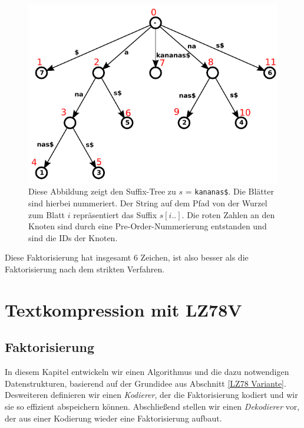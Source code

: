 \documentclass[a4paper,11pt]{scrartcl}%
\theoremstyle{change}
\theoremstyle{nonumberplain}
\theoremstyle{change}
\theoremstyle{nonumberplain}
\theoremstyle{change}
\theoremstyle{nonumberplain}
\begin{document}
\begin{figure}[h]
	    \centering
		\includegraphics[scale=0.75]{./pics/kananas_suffixTree_inorder}
		 \caption{Diese Abbildung zeigt den Suffix-Tree zu $s$ = \texttt{kananas\$}. Die Blätter sind hierbei nummeriert. Der String auf dem Pfad von der Wurzel zum Blatt $i$ repräsentiert das Suffix $s[i..]$. Die roten Zahlen an den Knoten sind durch eine Pre-Order-Nummerierung entstanden und sind die IDs der Knoten.}
		 \label{fig:kananas}
\end{figure}

Diese Faktorisierung hat insgesamt 6 Zeichen, ist also besser als die Faktorisierung nach dem strikten Verfahren.

\section{Textkompression mit LZ78V}

\subsection{Faktorisierung}

In diesem Kapitel entwickeln wir einen Algorithmus und die dazu notwendigen Datenstrukturen, basierend auf der Grundidee aus Abschnitt \ref{LZ78 Variante}. 
Desweiteren definieren wir einen \textit{Kodierer}, der die Faktorisierung kodiert und wir sie so effizient abspeichern können.
Abschließend stellen wir einen \textit{Dekodierer} vor, der aus einer Kodierung wieder eine Faktorisierung aufbaut.
\end{document}
